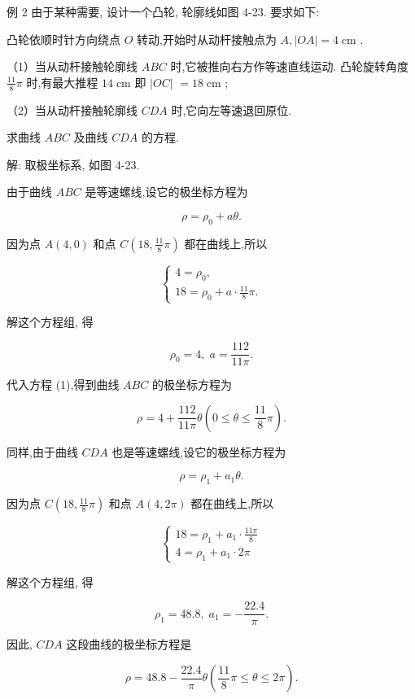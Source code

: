 \documentclass[lang=cn,newtx,10pt,scheme=chinese]{elegantbook}
\begin{document}
例 2 由于某种需要, 设计一个凸轮, 轮廓线如图 4-23. 要求如下:

凸轮依顺时针方向绕点 \(O\) 转动,开始时从动杆接触点为 \(A,\left| {OA}\right| = 4\mathrm{\;{cm}}\) .

（1）当从动杆接触轮廓线 \({ABC}\) 时,它被推向右方作等速直线运动. 凸轮旋转角度 \(\frac{11}{8}\pi\) 时,有最大推程 \({14}\mathrm{\;{cm}}\) 即 \(\left| {OC}\right|\) \(= {18}\mathrm{\;{cm}}\) ;

（2）当从动杆接触轮廓线 \({CDA}\) 时,它向左等速退回原位.

求曲线 \({ABC}\) 及曲线 \({CDA}\) 的方程.

解: 取极坐标系, 如图 4-23.

由于曲线 \({ABC}\) 是等速螺线,设它的极坐标方程为

\[
  \rho = {\rho }_{0} + {a\theta }. \tag{1}
\]

因为点 \(A\left( {4,0}\right)\) 和点 \(C\left( {{18},\frac{11}{8}\pi }\right)\) 都在曲线上,所以

\[
  \left\{ \begin{array}{l} 4 = {\rho }_{0}, \\ {18} = {\rho }_{0} + a \cdot \frac{11}{8}\pi . \end{array}\right.
\]

解这个方程组, 得

\[
    {\rho }_{0} = 4,\;a = \frac{112}{11\pi }.
\]

代入方程 (1),得到曲线 \({ABC}\) 的极坐标方程为

\[
  \rho = 4 + \frac{112}{11\pi }\theta \left( {0 \leq \theta \leq \frac{11}{8}\pi }\right) .
\]

同样,由于曲线 \({CDA}\) 也是等速螺线,设它的极坐标方程为

\[
  \rho = {\rho }_{1} + {a}_{1}\theta . \tag{2}
\]

因为点 \(C\left( {{18},\frac{11}{8}\pi }\right)\) 和点 \(A\left( {4,{2\pi }}\right)\) 都在曲线上,所以

\[
  \left\{ \begin{array}{l} {18} = {\rho }_{1} + {a}_{1} \cdot \frac{11\pi }{8} \\ 4 = {\rho }_{1} + {a}_{1} \cdot {2\pi } \end{array}\right.
\]

解这个方程组, 得

\[
    {\rho }_{1} = {48.8},\;{a}_{1} = - \frac{22.4}{\pi }.
\]

因此, \({CDA}\) 这段曲线的极坐标方程是

\[
  \rho = {48.8} - \frac{22.4}{\pi }\theta \left( {\frac{11}{8}\pi \leq \theta \leq {2\pi }}\right) .
\]
\end{document}
